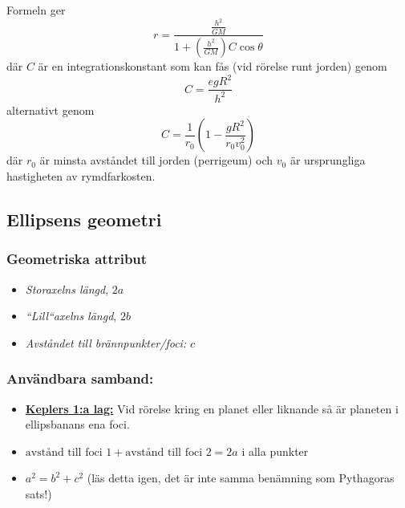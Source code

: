 \documentclass{article}
\newenvironment{ankiflashcard}[1]{}{}
\begin{document}
\begin{paracol}{2}
\begin{ankiflashcard}{Uttryck radie med hjälp av Binets formel}
    
Formeln ger
$$
r=\frac{\frac{h^2}{GM}}{1+(\frac{h^2}{GM})C\cos \theta}
$$
där $C$ är en integrationskonstant som kan fås (vid rörelse runt jorden) genom $$C=\frac{egR^2}{h^2}$$ alternativt genom $$C=\frac{1}{r_0}(1-\frac{gR^2}{r_0v_0^2})$$ där $r_0$ är minsta avståndet till jorden (perrigeum) och $v_0$ är ursprungliga hastigheten av rymdfarkosten.
\end{ankiflashcard}
\subsection{Ellipsens geometri}

\begin{ankiflashcard}{Hur benämns de olika sträckorna i ellipsen}
    
\subsubsection{Geometriska attribut}
\begin{itemize}
    \item \textit{Storaxelns längd}, $2a$
    \item  \textit{``Lill``axelns längd}, $2b$
    \item \textit{Avståndet till brännpunkter/foci:} $c$
\end{itemize}
\end{ankiflashcard}


\begin{ankiflashcard}{Ställ upp användbara samband kring ellipsens geometri.}
\subsubsection{Användbara samband:}
\begin{itemize}
    \item \underline{\textbf{Keplers 1:a lag:}} Vid rörelse kring en planet eller liknande så är planeten i ellipsbanans ena foci.
    \item $\text{avstånd till foci 1}+\text{avstånd till foci 2} = 2a$ i alla punkter
    \item $a^2=b^2+c^2$ (läs detta igen, det är inte samma benämning som Pythagoras sats!)
\end{itemize}
\end{ankiflashcard}


\end{paracol}
\end{document}
